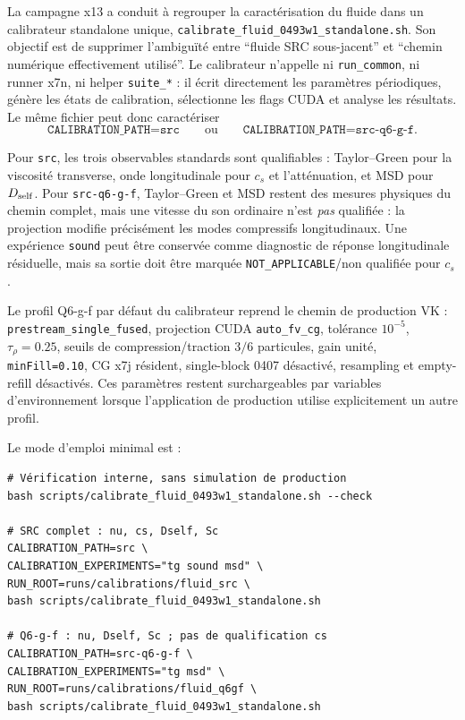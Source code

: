 \documentclass[11pt,a4paper]{article}
\begin{document}
La campagne x13 a conduit à regrouper la caractérisation du fluide dans un calibrateur standalone unique, \texttt{calibrate\_fluid\_0493w1\_standalone.sh}. Son objectif est de supprimer l'ambiguïté entre ``fluide SRC sous-jacent'' et ``chemin numérique effectivement utilisé''. Le calibrateur n'appelle ni \texttt{run\_common}, ni runner x7n, ni helper \texttt{suite\_*} : il écrit directement les paramètres périodiques, génère les états de calibration, sélectionne les flags CUDA et analyse les résultats. Le même fichier peut donc caractériser
\begin{equation}
  \texttt{CALIBRATION\_PATH=src}
  \qquad\text{ou}\qquad
  \texttt{CALIBRATION\_PATH=src-q6-g-f}.
\end{equation}

Pour \texttt{src}, les trois observables standards sont qualifiables : Taylor--Green pour la viscosité transverse, onde longitudinale pour $c_s$ et l'atténuation, et MSD pour $D_{\rm self}$. Pour \texttt{src-q6-g-f}, Taylor--Green et MSD restent des mesures physiques du chemin complet, mais une vitesse du son ordinaire n'est \emph{pas} qualifiée : la projection modifie précisément les modes compressifs longitudinaux. Une expérience \texttt{sound} peut être conservée comme diagnostic de réponse longitudinale résiduelle, mais sa sortie doit être marquée \texttt{NOT\_APPLICABLE}/non qualifiée pour $c_s$.

Le profil Q6-g-f par défaut du calibrateur reprend le chemin de production VK : \texttt{prestream\_single\_fused}, projection CUDA \texttt{auto\_fv\_cg}, tolérance $10^{-5}$, $\tau_\rho=0.25$, seuils de compression/traction $3/6$ particules, gain unité, \texttt{minFill=0.10}, CG x7j résident, single-block 0407 désactivé, resampling et empty-refill désactivés. Ces paramètres restent surchargeables par variables d'environnement lorsque l'application de production utilise explicitement un autre profil.

Le mode d'emploi minimal est :
\begin{verbatim}
# Vérification interne, sans simulation de production
bash scripts/calibrate_fluid_0493w1_standalone.sh --check

# SRC complet : nu, cs, Dself, Sc
CALIBRATION_PATH=src \
CALIBRATION_EXPERIMENTS="tg sound msd" \
RUN_ROOT=runs/calibrations/fluid_src \
bash scripts/calibrate_fluid_0493w1_standalone.sh

# Q6-g-f : nu, Dself, Sc ; pas de qualification cs
CALIBRATION_PATH=src-q6-g-f \
CALIBRATION_EXPERIMENTS="tg msd" \
RUN_ROOT=runs/calibrations/fluid_q6gf \
bash scripts/calibrate_fluid_0493w1_standalone.sh
\end{verbatim}
\end{document}
